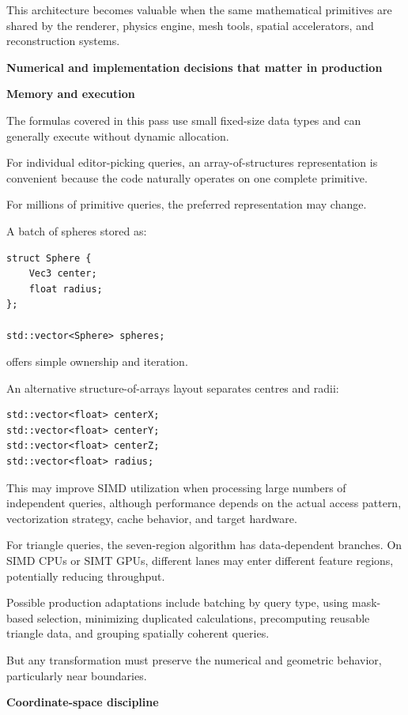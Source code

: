This architecture becomes valuable when the same mathematical primitives are shared by the renderer, physics engine, mesh tools, spatial accelerators, and reconstruction systems.

\textbf{Numerical and implementation decisions that matter in production}

\textbf{Memory and execution}

The formulas covered in this pass use small fixed-size data types and can generally execute without dynamic allocation.

For individual editor-picking queries, an array-of-structures representation is convenient because the code naturally operates on one complete primitive.

For millions of primitive queries, the preferred representation may change.

A batch of spheres stored as:

\begin{verbatim}
struct Sphere {
    Vec3 center;
    float radius;
};

std::vector<Sphere> spheres;
\end{verbatim}

offers simple ownership and iteration.

An alternative structure-of-arrays layout separates centres and radii:

\begin{verbatim}
std::vector<float> centerX;
std::vector<float> centerY;
std::vector<float> centerZ;
std::vector<float> radius;
\end{verbatim}

This may improve SIMD utilization when processing large numbers of independent queries, although performance depends on the actual access pattern, vectorization strategy, cache behavior, and target hardware.

For triangle queries, the seven-region algorithm has data-dependent branches. On SIMD CPUs or SIMT GPUs, different lanes may enter different feature regions, potentially reducing throughput.

Possible production adaptations include batching by query type, using mask-based selection, minimizing duplicated calculations, precomputing reusable triangle data, and grouping spatially coherent queries.

But any transformation must preserve the numerical and geometric behavior, particularly near boundaries.

\textbf{Coordinate-space discipline}

